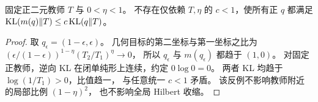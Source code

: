 \begin{proposition}
\label{prop:no-global-kl-factor}
固定正二元教师 $T$ 与 $0<\eta<1$。
不存在仅依赖 $T,\eta$ 的 $c<1$，使所有正 $q$ 都满足
$\operatorname{KL}(m(q)\Vert T)\le c\operatorname{KL}(q\Vert T)$。
\end{proposition}
\begin{proof}
取 $q_\epsilon=(1-\epsilon,\epsilon)$。
几何目标的第二坐标与第一坐标之比为
$(\epsilon/(1-\epsilon))^{1-\eta}(T_2/T_1)^\eta\to0$，
所以 $q_\epsilon$ 与 $m(q_\epsilon)$ 都趋于 $(1,0)$。
对固定正教师，逆向 KL 在闭单纯形上连续，约定 $0\log0=0$。
两者 KL 均趋于 $\log(1/T_1)>0$，比值趋一，
与任意统一 $c<1$ 矛盾。
该反例不影响教师附近的局部比例 $(1-\eta)^2$，
也不影响全局 Hilbert 收缩。
\end{proof}
